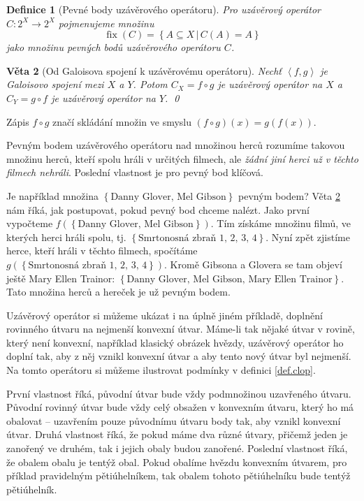 \documentclass[12pt]{article}
\newcommand{\sep}{\,|\,}
\newcommand{\adds}[1]{\left\{#1\right\}}
\newcommand{\addsp}[1]{\left<#1\right>}
\newcommand{\strong}[1]{{\em #1}}
\DeclareMathOperator{\fix}{fix}
\newtheorem{mydef}{Definice}
\newtheorem{theorem}[mydef]{Věta}
\begin{document}
\begin{mydef}[Pevné body uzávěrového operátoru]
Pro uzávěrový operátor $C: 2^X\rightarrow2^X$ pojmenujeme množinu
$$
\fix(C)=\adds{A\subseteq X\sep C(A)=A}
$$
jako množinu pevných bodů uzávěrového operátoru $C$.
\end{mydef}

\begin{theorem}[Od Galoisova spojení k uzávěrovému operátoru]\label{th.galcl}
Nechť $\addsp{f,g}$ je Galoisovo spojení mezi $X$ a $Y$. Potom $C_X=f\circ g$ je uzávěrový operátor na $X$ a $C_Y=g\circ f$ je uzávěrový operátor na $Y$. 
\qed\end{theorem}

Zápis $f \circ g$ značí skládání množin ve smyslu $(f \circ g)(x) = g(f(x))$.

Pevným bodem uzávěrového operátoru nad množinou herců rozumíme takovou množinu herců, kteří spolu hráli v určitých filmech, ale \strong{žádní jiní herci už v těchto filmech nehráli}. Poslední vlastnost je pro pevný bod klíčová. 

Je například množina $\adds{\mbox{Danny Glover, Mel Gibson}}$ pevným bodem? Věta \ref{th.galcl} nám říká, jak postupovat, pokud pevný bod chceme nalézt. Jako první vypočteme $f(\adds{\mbox{Danny Glover, Mel Gibson}})$. Tím získáme množinu filmů, ve kterých herci hráli spolu, tj. $\adds{\mbox{Smrtonosná zbraň 1, 2, 3, 4}}$. Nyní zpět zjistíme herce, kteří hráli v těchto filmech, spočítáme $g(\adds{\mbox{Smrtonosná zbraň 1, 2, 3, 4}})$. Kromě Gibsona a Glovera se tam objeví ještě Mary Ellen Trainor: $\adds{\mbox{Danny Glover, Mel Gibson, Mary Ellen Trainor}}$. Tato množina herců a hereček je už pevným bodem. 

Uzávěrový operátor si můžeme ukázat i na úplně jiném příkladě, doplnění rovinného útvaru na nejmenší konvexní útvar. Máme-li tak nějaké útvar v rovině, který není konvexní, například klasický obrázek hvězdy, uzávěrový operátor ho doplní tak, aby z něj vznikl konvexní útvar a aby tento nový útvar byl nejmenší. Na tomto operátoru si můžeme ilustrovat podmínky v definici \ref{def.clop}.

První vlastnost říká, původní útvar bude vždy podmnožinou uzavřeného útvaru. Původní rovinný útvar bude vždy celý obsažen v konvexním útvaru, který ho má obalovat -- uzavřením pouze  původnímu útvaru body tak, aby vznikl konvexní útvar. Druhá vlastnost říká, že pokud máme dva různé útvary, přičemž jeden je zanořený ve druhém, tak i jejich obaly budou zanořené. Poslední vlastnost říká, že obalem obalu je tentýž obal. Pokud obalíme hvězdu konvexním útvarem, pro příklad pravidelným pětiúhelníkem, tak obalem tohoto pětiúhelníku bude tentýž pětiúhelník.
\end{document}
